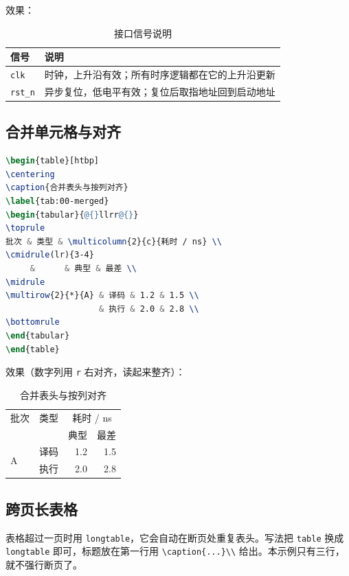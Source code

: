效果：

\begin{table}[htbp]
\centering
\caption{接口信号说明}
\label{tab:00-signals}
\begin{tabularx}{\linewidth}{@{}P{22mm}Y@{}}
\toprule
信号 & 说明 \\
\midrule
\texttt{clk} & 时钟，上升沿有效；所有时序逻辑都在它的上升沿更新 \\
\texttt{rst\_n} & 异步复位，低电平有效；复位后取指地址回到启动地址 \\
\bottomrule
\end{tabularx}
\end{table}

\subsection{合并单元格与对齐}

\begin{lstlisting}[language=TeX]
\begin{table}[htbp]
\centering
\caption{合并表头与按列对齐}
\label{tab:00-merged}
\begin{tabular}{@{}llrr@{}}
\toprule
批次 & 类型 & \multicolumn{2}{c}{耗时 / ns} \\
\cmidrule(lr){3-4}
     &      & 典型 & 最差 \\
\midrule
\multirow{2}{*}{A} & 译码 & 1.2 & 1.5 \\
                   & 执行 & 2.0 & 2.8 \\
\bottomrule
\end{tabular}
\end{table}
\end{lstlisting}

效果（数字列用 \texttt{r} 右对齐，读起来整齐）：

\begin{table}[htbp]
\centering
\caption{合并表头与按列对齐}
\label{tab:00-merged}
\begin{tabular}{@{}llrr@{}}
\toprule
批次 & 类型 & \multicolumn{2}{c}{耗时 / ns} \\
\cmidrule(lr){3-4}
     &      & 典型 & 最差 \\
\midrule
\multirow{2}{*}{A} & 译码 & 1.2 & 1.5 \\
                   & 执行 & 2.0 & 2.8 \\
\bottomrule
\end{tabular}
\end{table}

\subsection{跨页长表格}

表格超过一页时用 \texttt{longtable}，它会自动在断页处重复表头。写法把
\texttt{table} 换成 \texttt{longtable} 即可，标题放在第一行用
\verb|\caption{...}\\| 给出。本示例只有三行，就不强行断页了。

